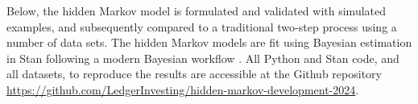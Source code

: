 Below, the hidden Markov model is formulated
and validated with simulated examples, and 
subsequently compared
to a traditional two-step process using
a number of data sets. The hidden Markov
models are fit using Bayesian estimation
in Stan \citep{stan2017} following a modern Bayesian
workflow \citep{gelman2020}.
All Python and Stan code, and all datasets, to 
reproduce the results
are accessible at the Github repository
\url{https://github.com/LedgerInvesting/hidden-markov-development-2024}.

